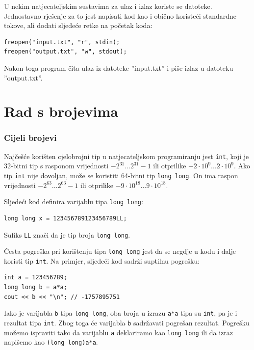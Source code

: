 U nekim natjecateljskim sustavima za ulaz i izlaz
koriste se datoteke.
Jednostavno rješenje za to jest napisati
kod kao i obično koristeći standardne tokove,
ali dodati sljedeće retke na početak koda:
\begin{lstlisting}
freopen("input.txt", "r", stdin);
freopen("output.txt", "w", stdout);
\end{lstlisting}
Nakon toga program čita ulaz iz datoteke
''input.txt'' i piše izlaz u datoteku
''output.txt''.

\section{Rad s brojevima}


\subsubsection{Cijeli brojevi}

Najčešće korišten cjelobrojni tip u natjecateljskom programiranju
jest \texttt{int}, koji je 32-bitni tip s
rasponom vrijednosti $-2^{31} \ldots 2^{31}-1$
ili otprilike $-2 \cdot 10^9 \ldots 2 \cdot 10^9$.
Ako tip \texttt{int} nije dovoljan,
može se koristiti 64-bitni tip \texttt{long long}.
On ima raspon vrijednosti $-2^{63} \ldots 2^{63}-1$
ili otprilike $-9 \cdot 10^{18} \ldots 9 \cdot 10^{18}$.

Sljedeći kod definira
varijablu tipa \texttt{long long}:
\begin{lstlisting}
long long x = 123456789123456789LL;
\end{lstlisting}
Sufiks \texttt{LL} znači da je
tip broja \texttt{long long}.

Česta pogreška pri korištenju tipa \texttt{long long}
jest da se negdje u kodu i dalje koristi
tip \texttt{int}.
Na primjer, sljedeći kod sadrži
suptilnu pogrešku:

\begin{lstlisting}
int a = 123456789;
long long b = a*a;
cout << b << "\n"; // -1757895751
\end{lstlisting}

Iako je varijabla \texttt{b} tipa \texttt{long long},
oba broja u izrazu \texttt{a*a}
tipa su \texttt{int}, pa je i rezultat
tipa \texttt{int}.
Zbog toga će varijabla \texttt{b}
sadržavati pogrešan rezultat.
Pogrešku možemo ispraviti tako da
varijablu \texttt{a} deklariramo kao \texttt{long long} ili
da izraz napišemo kao \texttt{(long long)a*a}.

